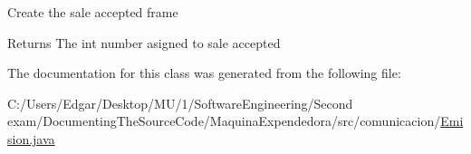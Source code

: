 Create the sale accepted frame \begin{DoxyReturn}{Returns}
The int number asigned to sale accepted 
\end{DoxyReturn}


The documentation for this class was generated from the following file\+:\begin{DoxyCompactItemize}
\item 
C\+:/\+Users/\+Edgar/\+Desktop/\+M\+U/1/\+Software\+Engineering/\+Second exam/\+Documenting\+The\+Source\+Code/\+Maquina\+Expendedora/src/comunicacion/\mbox{\hyperlink{_emision_8java}{Emision.\+java}}\end{DoxyCompactItemize}
